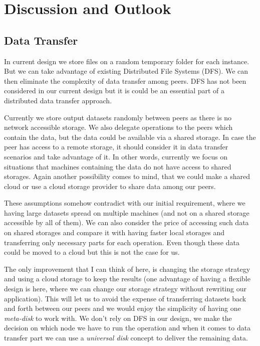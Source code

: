 \chapter{Discussion and Outlook}
\label{cha:discussions}

\section{Data Transfer}
In current design we store files on a random temporary folder for each instance.
But we can take advantage of existing Distributed File Systems (DFS).
We can then eliminate the complexity of data transfer among peers. 
DFS has not been considered in our current design but it is could be an 
essential part of a distributed data transfer approach.

Currently we store output datasets randomly between peers as there is no
network accessible storage.
We also delegate operations to the peers which contain the data, 
but the data could be available via a shared storage.
In case the peer has access to a remote storage, 
it should consider it in data transfer scenarios and take advantage of it. 
In other words, currently we focus on situations that
machines containing the data do not have access to shared storages.
Again another possibility comes to mind, 
that we could make a shared cloud or use a cloud storage provider to 
share data among our peers.

These assumptions somehow contradict with our initial requirement,
where we having large datasets spread on multiple machines (and not on a shared storage accessible by all of them). 
We can also consider the price of accessing such data on shared storages and
compare it with having faster local storages and transferring only necessary parts for each operation.
Even though these data could be moved to a cloud but this is not the case for us.

The only improvement that I can think of here, 
is changing the storage strategy and using a cloud storage to keep the results
(one advantage of having a flexible design is here, 
where we can change our storage strategy without rewriting our application).
This will let us to avoid the expense of transferring datasets back and forth
between our peers and we would enjoy the simplicity of having one \textit{meta-disk}
to work with. 
We don't rely on DFS in our design, we make the decision 
on which node we have to run the operation and when it comes to 
data transfer part we can use a \textit{universal disk} concept to deliver the
remaining data.

